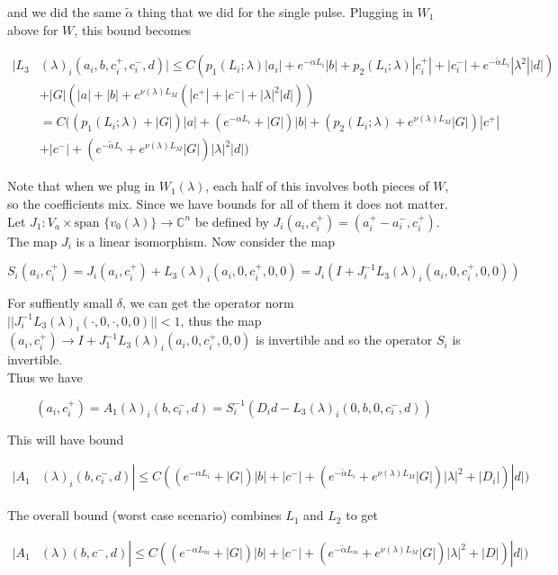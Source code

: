 \documentclass[12pt]{article}
\def\C{{\mathbb C}}
\begin{document}
\begin{enumerate}
and we did the same $\tilde{\alpha}$ thing that we did for the single pulse. Plugging in $W_1$ above for $W$, this bound becomes

\begin{align*}
|L_3&(\lambda)_i(a_i, b, c_i^+, c_i^-, d)| \leq C ( p_1(L_i; \lambda)|a_i|
+ e^{-\alpha L_i}|b| + p_2(L_i; \lambda)|c_i^+| + |c_i^-| + e^{-\tilde{\alpha} L_i} |\lambda^2| |d| ) \\
&+ |G| (|a| + |b| + e^{\nu(\lambda)L_M}(|c^+| + |c^-| + |\lambda|^2 |d| )) \\
&= C( (p_1(L_i; \lambda) + |G|)|a| + (e^{-\alpha L_i} + |G|) |b| + ( p_2(L_i; \lambda) + e^{\nu(\lambda)L_M} |G|) |c^+| \\
&+ |c^-| + (e^{-\tilde{\alpha} L_i} + e^{\nu(\lambda)L_M} |G|) |\lambda|^2 |d| )
\end{align*}

Note that when we plug in $W_1(\lambda)$, each half of this involves both pieces of $W$, so the coefficients mix. Since we have bounds for all of them it does not matter.\\ 

Let $J_1: V_a \times \text{span }\{v_0(\lambda)\} \rightarrow \C^n$ be defined by $J_i(a_i, c_i^+) = (a_i^+ - a_i^-, c_i^+)$. The map $J_i$ is a linear isomorphism. Now consider the map

\[
S_i(a_i, c_i^+) = J_i (a_i, c_i^+) + L_3(\lambda)_i(a_i, 0, c_i^+, 0, 0) = J_i( I + J_i^{-1} L_3(\lambda)_i(a_i, 0, c_i^+, 0, 0))
\]


For suffiently small $\delta$, we can get the operator norm $||J_i^{-1} L_3(\lambda)_i(\cdot, 0, \cdot, 0, 0)|| < 1$, thus the map $(a_i, c_i^+) \rightarrow I + J_1^{-1} L_3(\lambda)_i(a_i, 0, c_i^+, 0, 0)$ is invertible and so the operator $S_i$ is invertible.\\

Thus we have

\[
(a_i, c_i^+) = A_1(\lambda)_i(b, c_i^-, d) = S_i^{-1}(D_i d - L_3(\lambda)_i(0, b, 0, c_i^-, d))
\]

This will have bound

\begin{align*}
|A_1&(\lambda)_i(b, c_i^-, d)| \leq C( (e^{-\alpha L_i} + |G|) |b| + |c^-| + (e^{-\tilde{\alpha} L_i} + e^{\nu(\lambda)L_M} |G|) |\lambda|^2 + |D_i|) |d| )
\end{align*}

The overall bound (worst case scenario) combines $L_1$ and $L_2$ to get

\begin{align*}
|A_1&(\lambda)(b, c^-, d)| \leq C( (e^{-\alpha L_m} + |G|) |b| + |c^-| + (e^{-\tilde{\alpha} L_m} + e^{\nu(\lambda)L_M} |G|) |\lambda|^2 + |D|) |d| )
\end{align*}


\end{enumerate}
\end{document}
